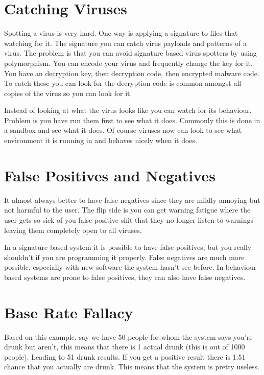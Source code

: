 \documentclass{article}
\begin{document}


\section{Catching Viruses} %
\label{sec:catching_viruses}
	
Spotting a virus is very hard. One way is applying a signature to files that watching for it. The signature you can catch virus payloads and patterns of a virus. The problem is that you can avoid signature based virus spotters by using polymorphism. You can encode your virus and frequently change the key for it. You have an decryption key, then decryption code, then encrypted malware code. To catch these you can look for the decryption code is common amongst all copies of the virus so you can look for it.

Instead of looking at what the virus looks like you can watch for its behaviour. Problem is you have run them first to see what it does. Commonly this is done in a sandbox and see what it does. Of course viruses now can look to see what environment it is running in and behaves nicely when it does.



\section{False Positives and Negatives} %
\label{sec:false_positives_and_negatives}
	
It almost always better to have false negatives since they are mildly annoying but not harmful to the user. The flip side is you can get warning fatigue where the user gets so sick of you false positive shit that they no longer listen to warnings leaving them completely open to all viruses.

In a signature based system it is possible to have false positives, but you really shouldn't if you are programming it properly. False negatives are much more possible, especially with new software the system hasn't see before. In behaviour based systems are prone to false positives, they can also have false negatives.


\section{Base Rate Fallacy} %
\label{sec:base_rate_fallacy}
Based on this example, say we have 50 people for whom the system says you're drunk but aren't, this means that there is 1 actual drunk (this is out of 1000 people). Leading to 51 drunk results. If you get a positive result there is 1:51 chance that you actually are drunk. This means that the system is pretty useless.
\end{document}
